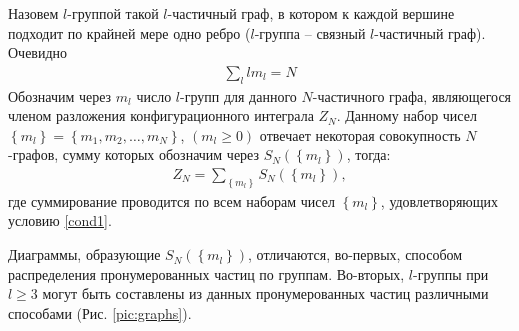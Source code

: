 Назовем $l$-группой такой $l$-частичный граф, в котором к каждой вершине подходит по крайней мере одно ребро ($l$-группа -- связный $l$-частичный граф). Очевидно
\vverh
\begin{gather}
	\sum_l l m_l = N \label{cond1}
\end{gather}
Обозначим через $m_l$ число $l$-групп для данного $N$-частичного графа, являющегося членом разложения конфигурационного интеграла $Z_N$. Данному набор чисел $\left\{ m_l \right\} = \left\{ m_1 , m_2 , \dots, m_N \right\}$, $( m_l \geqslant 0 )$ отвечает некоторая совокупность $N$-графов, сумму которых обозначим через $S_N \left( \left\{ m_l \right\} \right)$, тогда:
\vverh
\begin{gather}
	Z_N = \sum_{ \left\{ m_l \right\} } S_N \left( \left\{ m_l \right\} \right), \label{confsum}
\end{gather}
где суммирование проводится по всем наборам чисел $\left\{ m_l \right\}$, удовлетворяющих условию \eqref{cond1}. \par
Диаграммы, образующие $S_N \left( \left\{ m_l \right\} \right)$, отличаются, во-первых, способом распределения пронумерованных частиц по группам. Во-вторых, $l$-группы при $l \geqslant 3$ могут быть составлены из данных пронумерованных частиц различными способами (Рис. \ref{pic:graphs}).
\vverh
